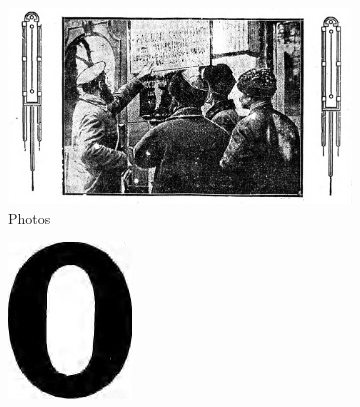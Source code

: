 \begin{figure}[ht]
\begin{minipage}[5cm]{0.3\textwidth}
        \begin{subfigure}{3cm}
            \includegraphics[width=\linewidth]{Images/logo FPs/photos/IMP-1929-08-23-a-i0002.jpg}
             \caption{Photos}
        \end{subfigure}
    \end{minipage}%
    \hfill
    \begin{minipage}[5cm]{0.3\textwidth}
        \centering
        \begin{subfigure}{1.9cm}
            \includegraphics[width=\linewidth]{Images/logo FPs/titles/LCE-1906-07-25-a-i0010.jpg}
            

\end{subfigure}
\end{minipage}
\end{figure}
